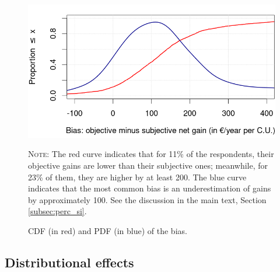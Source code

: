 \documentclass[12pt]{article} %
\begin{document}
\begin{appendices}
\vspace*{1.5cm}

\begin{figure}[ht!]
\centering
\includegraphics[width=.8\columnwidth]{Images/biais.png}
\parbox[t]{\columnwidth}{ %
\linespread{1.2}\selectfont \footnotesize{\textsc{Note:} The red curve indicates that for 11\% of the respondents, their objective gains are lower than their subjective ones; meanwhile, for 23\% of them, they are higher by at least 200\euros{}. The blue curve indicates that the most common bias is an underestimation of gains by approximately 100\euros{}. See the discussion in the main text, Section \vref{subsec:perc_si}. \caption{CDF (in red) and PDF (in blue) of the bias. \label{fig:bias}}}}
\end{figure}

\subsection{Distributional effects \label{subsec:app_distributive}}


\end{appendices}
\end{document}
